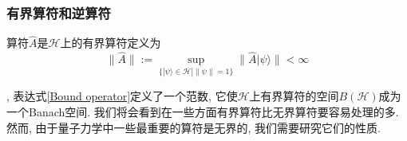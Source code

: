 \documentclass[a4paper,11pt]{article}
\theoremstyle{mystyle}
\begin{document}
\subsubsection{有界算符和逆算符}
\begin{definition}[有界算符]
  算符$\hat{A}$是$\mathcal{H}$上的有界算符定义为
\begin{equation}\label{Bound operator}
  \|\hat{A}\|:=\sup_{\{|\psi\rangle\in\mathcal{H}|\|\psi\|=1\}}\|\hat{A}|\psi\rangle\|<\infty
\end{equation}
\end{definition}
, 表达式\ref{Bound operator}定义了一个范数, 它使$\mathcal{H}$上有界算符的空间$B(\mathcal{H})$成为一个Banach空间. 我们将会看到在一些方面有界算符比无界算符要容易处理的多. 然而, 由于量子力学中一些最重要的算符是无界的, 我们需要研究它们的性质.
\end{document}
